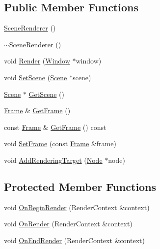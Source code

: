 \subsection*{Public Member Functions}
\begin{DoxyCompactItemize}
\item 
\mbox{\hyperlink{classec_1_1_scene_renderer_a7759ceff361e2d9b90ffe35ee61dc8c2}{Scene\+Renderer}} ()
\item 
\mbox{\hyperlink{classec_1_1_scene_renderer_ae8350e90e64b53e3dfb121c11a9d3283}{$\sim$\+Scene\+Renderer}} ()
\item 
void \mbox{\hyperlink{classec_1_1_scene_renderer_a87796739420a581ec2c5f0f80b7a8e1f}{Render}} (\mbox{\hyperlink{classec_1_1_window}{Window}} $\ast$window)
\item 
void \mbox{\hyperlink{classec_1_1_scene_renderer_a207e0e7112e94172615228838a34818d}{Set\+Scene}} (\mbox{\hyperlink{classec_1_1_scene}{Scene}} $\ast$scene)
\item 
\mbox{\hyperlink{classec_1_1_scene}{Scene}} $\ast$ \mbox{\hyperlink{classec_1_1_scene_renderer_ac7e6d95f7f81896b3dc263edc638e0e8}{Get\+Scene}} ()
\item 
\mbox{\hyperlink{classec_1_1_frame}{Frame}} \& \mbox{\hyperlink{classec_1_1_scene_renderer_a8c3935204b987c155e68372207822b62}{Get\+Frame}} ()
\item 
const \mbox{\hyperlink{classec_1_1_frame}{Frame}} \& \mbox{\hyperlink{classec_1_1_scene_renderer_a5b99b9830416ff17758286983cb66f5b}{Get\+Frame}} () const
\item 
void \mbox{\hyperlink{classec_1_1_scene_renderer_a925d9f915b47ea29d30e9db97c82ec80}{Set\+Frame}} (const \mbox{\hyperlink{classec_1_1_frame}{Frame}} \&frame)
\item 
void \mbox{\hyperlink{classec_1_1_scene_renderer_a8f3412dc907f3425d4e1004873946e21}{Add\+Rendering\+Target}} (\mbox{\hyperlink{classec_1_1_node}{Node}} $\ast$node)
\end{DoxyCompactItemize}
\subsection*{Protected Member Functions}
\begin{DoxyCompactItemize}
\item 
void \mbox{\hyperlink{classec_1_1_scene_renderer_ad74b9887e310e44acb92ead803fba56c}{On\+Begin\+Render}} (Render\+Context \&context)
\item 
void \mbox{\hyperlink{classec_1_1_scene_renderer_ae940eac2b75972449c024ca7da729d67}{On\+Render}} (Render\+Context \&context)
\item 
void \mbox{\hyperlink{classec_1_1_scene_renderer_a3e30cac2058462afdab997ec6a5ff884}{On\+End\+Render}} (Render\+Context \&context)
\end{DoxyCompactItemize}


